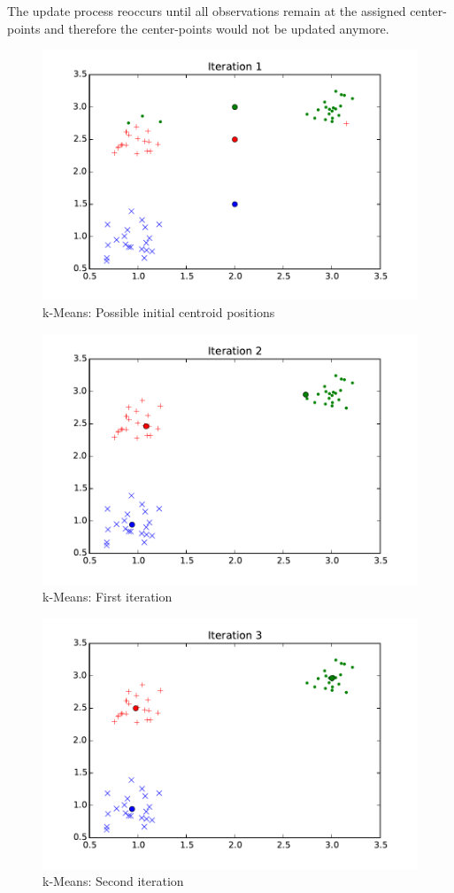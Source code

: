 The update process reoccurs until all observations remain at the assigned center-points and therefore the center-points would not be updated anymore.


\begin{figure}
\centering
\includegraphics[width=0.6\linewidth]{img/iteration01}
\caption{k-Means: Possible initial centroid positions}
\label{fig:kmeans:iteration01}
\end{figure}

\begin{figure}
\centering
\includegraphics[width=0.6\linewidth]{img/iteration02}
\caption{k-Means: First iteration}
\label{fig:kmeans:iteration02}
\end{figure}

\begin{figure}
\centering
\includegraphics[width=0.6\linewidth]{img/iteration03}
\caption{k-Means: Second iteration}
\label{fig:kmeans:iteration03}
\end{figure}


